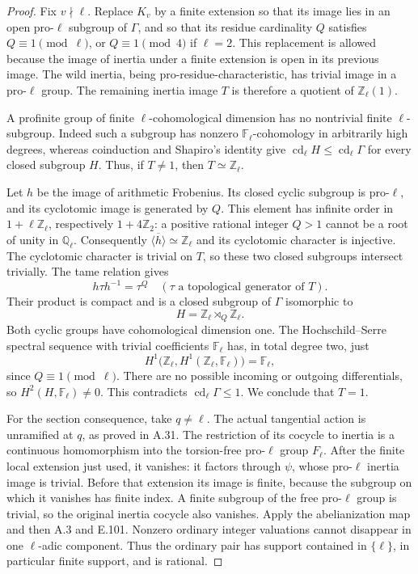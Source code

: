 \begin{proof}
Fix \(v\nmid\ell\). Replace \(K_v\) by a finite extension
so that its image lies in an open pro-\(\ell\) subgroup of
\(\Gamma\), and so that its residue cardinality \(Q\) satisfies
\(Q\equiv1\pmod\ell\), or \(Q\equiv1\pmod4\) if
\(\ell=2\). This replacement is allowed because the image of
inertia under a finite extension is open in its previous image.
The wild inertia, being pro-residue-characteristic, has trivial
image in a pro-\(\ell\) group. The remaining inertia image
\(T\) is therefore a quotient of \(\mathbb Z_\ell(1)\).

A profinite group of finite \(\ell\)-cohomological dimension
has no nontrivial finite \(\ell\)-subgroup. Indeed such a subgroup
has nonzero \(\mathbb F_\ell\)-cohomology in arbitrarily high
degrees, whereas coinduction and Shapiro's identity give
\(\operatorname{cd}_\ell H\leq\operatorname{cd}_\ell\Gamma\)
for every closed subgroup \(H\). Thus, if \(T\ne1\), then
\(T\simeq\mathbb Z_\ell\).

Let \(h\) be the image of arithmetic Frobenius. Its closed cyclic
subgroup is pro-\(\ell\), and its cyclotomic image is generated
by \(Q\). This element has infinite order in
\(1+\ell\mathbb Z_\ell\), respectively
\(1+4\mathbb Z_2\): a positive rational integer \(Q>1\)
cannot be a root of unity in \(\mathbb Q_\ell\).
Consequently \(\overline{\langle h\rangle}\simeq\mathbb Z_\ell\)
and its cyclotomic character is injective. The cyclotomic character
is trivial on \(T\), so these two closed subgroups intersect
trivially. The tame relation gives
\[
 h\tau h^{-1}=\tau^Q
 \quad(\tau\text{ a topological generator of }T).
\]
Their product is compact and is a closed subgroup of \(\Gamma\)
isomorphic to
\[
       H=\mathbb Z_\ell\rtimes_Q\mathbb Z_\ell.
\]
Both cyclic groups have cohomological dimension one. The
Hochschild--Serre spectral sequence with trivial coefficients
\(\mathbb F_\ell\) has, in total degree two, just
\[
 H^1\bigl(\mathbb Z_\ell,
              H^1(\mathbb Z_\ell,\mathbb F_\ell)\bigr)
       =\mathbb F_\ell,
\]
since \(Q\equiv1\pmod\ell\). There are no possible incoming
or outgoing differentials, so \(H^2(H,\mathbb F_\ell)\ne0\).
This contradicts \(\operatorname{cd}_\ell\Gamma\leq1\).
We conclude that \(T=1\).

For the section consequence, take \(q\ne\ell\). The actual
tangential action is unramified at \(q\), as proved in A.31.
The restriction of its cocycle to inertia is a continuous
homomorphism into the torsion-free pro-\(\ell\) group
\(F_\ell\). After the finite local extension just used, it
vanishes: it factors through \(\psi\), whose pro-\(\ell\)
inertia image is trivial. Before that extension its image is finite,
because the subgroup on which it vanishes has finite index. A finite
subgroup of the free pro-\(\ell\) group is trivial, so the
original inertia cocycle also vanishes. Apply the abelianization
map and then A.3 and E.101. Nonzero ordinary integer valuations
cannot disappear in one \(\ell\)-adic component. Thus the
ordinary pair has support contained in \(\{\ell\}\), in
particular finite support, and is rational.
\end{proof}

